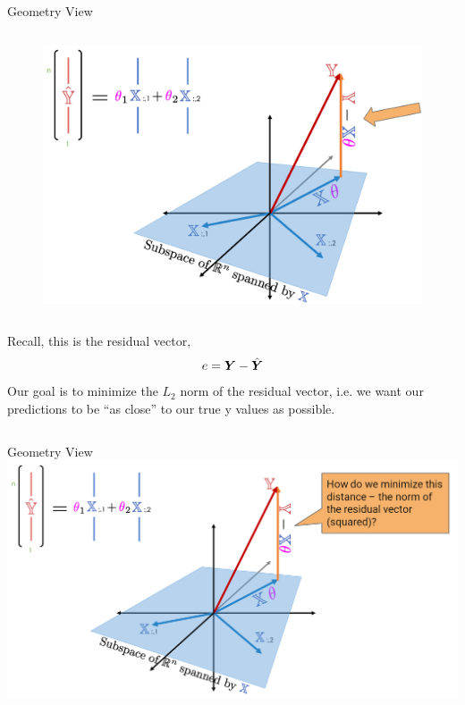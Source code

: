 \documentclass[aspectratio=169]{../latex_main/tntbeamer}  %
\begin{document}
	 
	 \begin{frame}{Geometry View}
	    \begin{colums}
	        \begin{column}{.6\textwidth}
	               \begin{figure}
	                    \includegraphics[scale=.3]{Bild7}
	                \end{figure}
	        \end{column}
	        \begin{column}{.3\textwidth}
	                Recall, this is the residual vector,
                    \begin{equation*}
                        e = \bm{Y} - {\hat{\bm{Y}}}
                    \end{equation*}
                    Our goal is to minimize the $L_2$ norm of the residual vector, i.e. we want our predictions to be “as close” to our true y values as possible.

	        \end{column}
	    \end{colums}
	\end{frame}
	
	
	 \begin{frame}{Geometry View}
	    \centering
	    \includegraphics[scale=.33]{Bild8}
	\end{frame}
	
\end{document}
